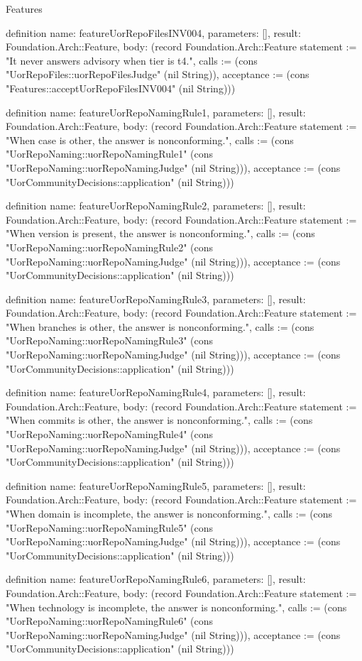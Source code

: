 \begin{lexlean}{Features}
\begin{semanticmodule}
definition{
  name: featureUorRepoFilesINV004,
  parameters: [],
  result: Foundation.Arch::Feature,
  body: (record Foundation.Arch::Feature {statement := "It never answers advisory when tier is t4.", calls := (cons "UorRepoFiles::uorRepoFilesJudge" (nil String)), acceptance := (cons "Features::acceptUorRepoFilesINV004" (nil String))})
}

definition{
  name: featureUorRepoNamingRule1,
  parameters: [],
  result: Foundation.Arch::Feature,
  body: (record Foundation.Arch::Feature {statement := "When case is other, the answer is nonconforming.", calls := (cons "UorRepoNaming::uorRepoNamingRule1" (cons "UorRepoNaming::uorRepoNamingJudge" (nil String))), acceptance := (cons "UorCommunityDecisions::application" (nil String))})
}

definition{
  name: featureUorRepoNamingRule2,
  parameters: [],
  result: Foundation.Arch::Feature,
  body: (record Foundation.Arch::Feature {statement := "When version is present, the answer is nonconforming.", calls := (cons "UorRepoNaming::uorRepoNamingRule2" (cons "UorRepoNaming::uorRepoNamingJudge" (nil String))), acceptance := (cons "UorCommunityDecisions::application" (nil String))})
}

definition{
  name: featureUorRepoNamingRule3,
  parameters: [],
  result: Foundation.Arch::Feature,
  body: (record Foundation.Arch::Feature {statement := "When branches is other, the answer is nonconforming.", calls := (cons "UorRepoNaming::uorRepoNamingRule3" (cons "UorRepoNaming::uorRepoNamingJudge" (nil String))), acceptance := (cons "UorCommunityDecisions::application" (nil String))})
}

definition{
  name: featureUorRepoNamingRule4,
  parameters: [],
  result: Foundation.Arch::Feature,
  body: (record Foundation.Arch::Feature {statement := "When commits is other, the answer is nonconforming.", calls := (cons "UorRepoNaming::uorRepoNamingRule4" (cons "UorRepoNaming::uorRepoNamingJudge" (nil String))), acceptance := (cons "UorCommunityDecisions::application" (nil String))})
}

definition{
  name: featureUorRepoNamingRule5,
  parameters: [],
  result: Foundation.Arch::Feature,
  body: (record Foundation.Arch::Feature {statement := "When domain is incomplete, the answer is nonconforming.", calls := (cons "UorRepoNaming::uorRepoNamingRule5" (cons "UorRepoNaming::uorRepoNamingJudge" (nil String))), acceptance := (cons "UorCommunityDecisions::application" (nil String))})
}

definition{
  name: featureUorRepoNamingRule6,
  parameters: [],
  result: Foundation.Arch::Feature,
  body: (record Foundation.Arch::Feature {statement := "When technology is incomplete, the answer is nonconforming.", calls := (cons "UorRepoNaming::uorRepoNamingRule6" (cons "UorRepoNaming::uorRepoNamingJudge" (nil String))), acceptance := (cons "UorCommunityDecisions::application" (nil String))})
}


\end{semanticmodule}
\end{lexlean}
